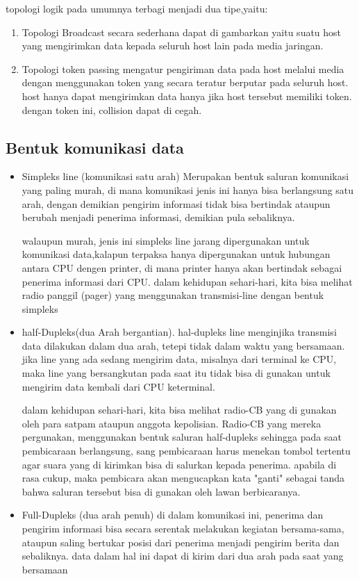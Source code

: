 topologi logik pada umumnya terbagi menjadi dua tipe,yaitu:
\begin{enumerate}
  \item Topologi Broadcast
        secara sederhana dapat di gambarkan yaitu suatu host yang mengirimkan data kepada seluruh host lain pada media jaringan.
  \item Topologi token passing
        mengatur pengiriman data pada host melalui media dengan menggunakan token yang secara teratur berputar pada seluruh host. host hanya dapat mengirimkan data hanya jika host tersebut memiliki token. dengan token ini, collision dapat di cegah.
\end{enumerate}

\subsection{Bentuk komunikasi data}
\begin{itemize}
  \item Simpleks line (komunikasi satu arah)
        Merupakan bentuk saluran komunikasi yang paling murah, di mana komunikasi jenis ini hanya bisa berlangsung satu arah, dengan demikian pengirim informasi tidak bisa bertindak ataupun berubah menjadi penerima informasi, demikian pula sebaliknya.

        walaupun murah, jenis ini simpleks line jarang dipergunakan untuk komunikasi data,kalapun terpaksa hanya dipergunakan untuk hubungan antara CPU dengen printer, di mana printer hanya akan bertindak sebagai penerima informasi dari CPU. dalam kehidupan sehari-hari, kita bisa melihat radio panggil (pager) yang menggunakan transmisi-line dengan bentuk simpleks
  \item half-Dupleks(dua Arah bergantian).
        hal-dupleks line menginjika transmisi data dilakukan dalam dua arah, tetepi tidak dalam waktu yang bersamaan. jika line yang ada sedang mengirim data, misalnya dari terminal ke CPU, maka line yang bersangkutan pada saat itu tidak bisa di gunakan untuk mengirim data kembali dari CPU keterminal.

        dalam kehidupan sehari-hari, kita bisa melihat radio-CB yang di gunakan oleh para satpam ataupun anggota kepolisian. Radio-CB yang mereka pergunakan, menggunakan bentuk saluran half-dupleks sehingga pada saat pembicaraan berlangsung, sang pembicaraan harus menekan tombol tertentu agar suara yang di kirimkan bisa di salurkan kepada penerima. apabila di rasa cukup, maka pembicara akan mengucapkan kata "ganti"
        sebagai tanda bahwa saluran tersebut bisa di gunakan oleh lawan berbicaranya.
  \item Full-Dupleks (dua arah penuh)
        di dalam komunikasi ini, penerima dan pengirim informasi bisa secara serentak melakukan kegiatan bersama-sama, ataupun saling bertukar posisi dari penerima menjadi pengirim berita dan sebaliknya. data dalam hal ini dapat di kirim dari dua arah pada saat yang bersamaan
\end{itemize}

